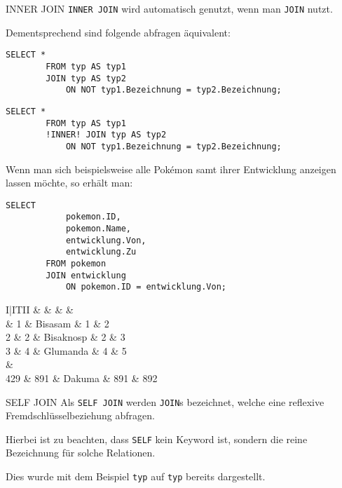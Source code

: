 \begin{sql}{INNER JOIN}
    \texttt{INNER JOIN} wird automatisch genutzt, wenn man \texttt{JOIN} nutzt.

    Dementsprechend sind folgende abfragen äquivalent:

    \begin{lstlisting}[language=mysql]
        SELECT *
        FROM typ AS typ1
        JOIN typ AS typ2
            ON NOT typ1.Bezeichnung = typ2.Bezeichnung;
    \end{lstlisting}

    \begin{lstlisting}[language=mysql]
        SELECT *
        FROM typ AS typ1
        !INNER! JOIN typ AS typ2
            ON NOT typ1.Bezeichnung = typ2.Bezeichnung;
    \end{lstlisting}

    Wenn man sich beispielsweise alle Pokémon samt ihrer Entwicklung anzeigen lassen möchte, so erhält man:

    \begin{lstlisting}[language=mysql]
        SELECT
            pokemon.ID,
            pokemon.Name,
            entwicklung.Von,
            entwicklung.Zu
        FROM pokemon
        JOIN entwicklung
            ON pokemon.ID = entwicklung.Von;
    \end{lstlisting}

    \setcounter{rownum}{0}
    \begin{tabular}{I|ITII}
        &  &  &  &  \\ & 1 & Bisasam & 1 & 2 \\
        2 & 2 & Bisaknosp & 2 & 3 \\
        3 & 4 & Glumanda & 4 & 5 \\
         &  \\
        429 & 891 & Dakuma & 891 & 892 \\
    \end{tabular}
\end{sql}

\begin{defi}{SELF JOIN}
    Als \texttt{SELF JOIN} werden \texttt{JOIN}s bezeichnet, welche eine reflexive Fremdschlüsselbeziehung abfragen.
    
    Hierbei ist zu beachten, dass \texttt{SELF} kein Keyword ist, sondern die reine Bezeichnung für solche Relationen.

    Dies wurde mit dem Beispiel \texttt{typ} auf \texttt{typ} bereits dargestellt.
\end{defi}

